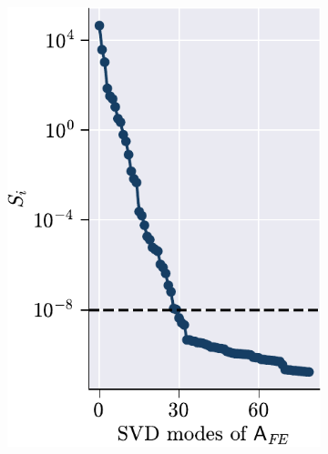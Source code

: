 \documentclass[11pt]{article}
\begin{document}
\begin{figure}[t!]
\centering
\begin{subfigure}[b]{0.33\linewidth}
\centering
\includegraphics[height=1.3\linewidth]{S_AFE.pdf}
\caption{}
\label{fig:svd_AE}
\end{subfigure}\hfill
\begin{subfigure}[b]{0.33\linewidth}
\centering

\end{subfigure}
\end{figure}
\end{document}
